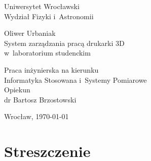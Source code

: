 \documentclass[a4paper,12pt,reqno]{article}
\begin{document}
	



\begin{center}
	
	\thispagestyle{empty}
	
	\Large 
	Uniwersytet Wrocławski\\
	Wydział Fizyki i~Astronomii\\
	\vspace{0.8cm}
	\vspace{1.8cm}
	
	\Large Oliwer Urbaniak \\
	\vspace{3.2cm}
	\Large System zarządzania pracą drukarki 3D\\
	w~laboratorium studenckim \\
	
\end{center}
\vspace{5.5cm}
\begin{flushright}
	\large{ Praca inżynierska na kierunku \\Informatyka Stosowana i~Systemy Pomiarowe \\}
	\vspace{0.5cm}
	\large{ Opiekun \\ dr Bartosz Brzostowski}
\end{flushright}
\vspace{2.2cm}

\begin{center}
	\large Wrocław, \today
\end{center}

\newpage


\tableofcontents

\newpage
\clearpage
\section*{Streszczenie}
\end{document}
